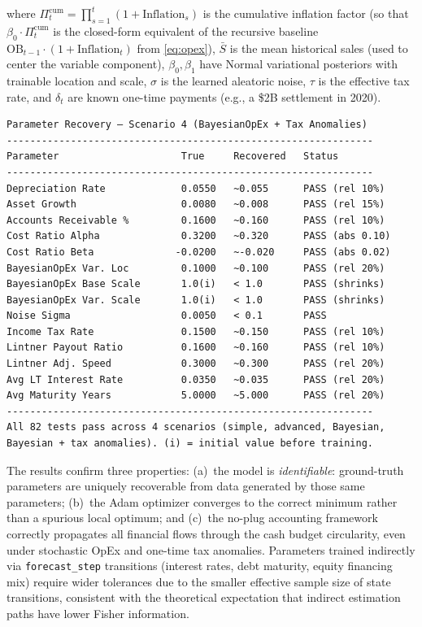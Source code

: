 \documentclass[12pt,a4paper]{article}
\begin{document}
where $\Pi_t^{\text{cum}} = \prod_{s=1}^{t}(1 + \text{Inflation}_s)$ is
the cumulative inflation factor (so that $\beta_0 \cdot \Pi_t^{\text{cum}}$
is the closed-form equivalent of the recursive baseline
$\text{OB}_{t-1} \cdot (1 + \text{Inflation}_t)$ from \eqref{eq:opex}),
$\bar{S}$ is the mean historical sales (used to center the variable
component), $\beta_0, \beta_1$ have Normal variational posteriors with
trainable location and scale, $\sigma$ is the learned aleatoric noise,
$\tau$ is the effective tax rate, and $\delta_t$ are known one-time
payments (e.g., a \$2B settlement in 2020).

\begin{lstlisting}[style=console, caption={Parameter recovery results for Scenario~4: all parameters recovered within tolerance}, label=lst:param_recovery_s4]
Parameter Recovery — Scenario 4 (BayesianOpEx + Tax Anomalies)
---------------------------------------------------------------
Parameter                     True     Recovered   Status
---------------------------------------------------------------
Depreciation Rate             0.0550   ~0.055      PASS (rel 10%)
Asset Growth                  0.0080   ~0.008      PASS (rel 15%)
Accounts Receivable %         0.1600   ~0.160      PASS (rel 10%)
Cost Ratio Alpha              0.3200   ~0.320      PASS (abs 0.10)
Cost Ratio Beta              -0.0200   ~-0.020     PASS (abs 0.02)
BayesianOpEx Var. Loc         0.1000   ~0.100      PASS (rel 20%)
BayesianOpEx Base Scale       1.0(i)   < 1.0       PASS (shrinks)
BayesianOpEx Var. Scale       1.0(i)   < 1.0       PASS (shrinks)
Noise Sigma                   0.0050   < 0.1       PASS
Income Tax Rate               0.1500   ~0.150      PASS (rel 10%)
Lintner Payout Ratio          0.1600   ~0.160      PASS (rel 10%)
Lintner Adj. Speed            0.3000   ~0.300      PASS (rel 20%)
Avg LT Interest Rate          0.0350   ~0.035      PASS (rel 20%)
Avg Maturity Years            5.0000   ~5.000      PASS (rel 20%)
---------------------------------------------------------------
All 82 tests pass across 4 scenarios (simple, advanced, Bayesian,
Bayesian + tax anomalies). (i) = initial value before training.
\end{lstlisting}

The results confirm three properties: (a)~the model is
\emph{identifiable}: ground-truth parameters are uniquely recoverable
from data generated by those same parameters; (b)~the Adam optimizer
converges to the correct minimum rather than a spurious local optimum;
and (c)~the no-plug accounting framework correctly propagates all
financial flows through the cash budget circularity, even under
stochastic OpEx and one-time tax anomalies.  Parameters trained
indirectly via \texttt{forecast\_step} transitions (interest rates,
debt maturity, equity financing mix) require wider tolerances due to
the smaller effective sample size of state transitions, consistent with
the theoretical expectation that indirect estimation paths have lower
Fisher information.
\end{document}
